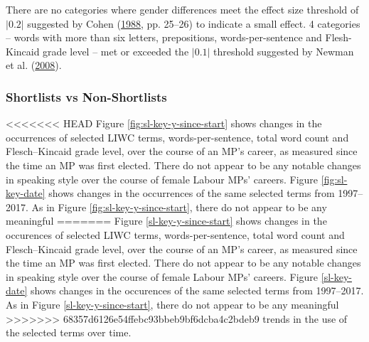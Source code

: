 \documentclass[]{article}
\theoremstyle{definition}
\theoremstyle{definition}
\theoremstyle{definition}
\theoremstyle{remark}
\begin{document}
\begin{table}[H]
\begin{table}[H]
\begin{table}[H]
There are no categories where gender differences meet the effect size
threshold of \(|0.2|\) suggested by Cohen
(\protect\hyperlink{ref-cohen1988}{1988}, pp. 25--26) to indicate a
small effect. 4 categories -- words with more than six letters,
prepositions, words-per-sentence and Flesh-Kincaid grade level -- met or
exceeded the \(|0.1|\) threshold suggested by Newman et al.
(\protect\hyperlink{ref-newman2008}{2008}).

\hypertarget{shortlists-vs-non-shortlists}{%
\subsubsection{Shortlists vs
Non-Shortlists}\label{shortlists-vs-non-shortlists}}

<<<<<<< HEAD
Figure \ref{fig:sl-key-y-since-start} shows changes in the occurrences
of selected LIWC terms, words-per-sentence, total word count and
Flesch--Kincaid grade level, over the course of an MP's career, as
measured since the time an MP was first elected. There do not appear to
be any notable changes in speaking style over the course of female
Labour MPs' careers. Figure \ref{fig:sl-key-date} shows changes in the
occurrences of the same selected terms from 1997--2017. As in Figure
\ref{fig:sl-key-y-since-start}, there do not appear to be any meaningful
=======
Figure \ref{sl-key-y-since-start} shows changes in the occurences of
selected LIWC terms, words-per-sentence, total word count and
Flesch--Kincaid grade level, over the course of an MP's career, as
measured since the time an MP was first elected. There do not appear to
be any notable changes in speaking style over the course of female
Labour MPs' careers. Figure \ref{sl-key-date} shows changes in the
occurences of the same selected terms from 1997--2017. As in Figure
\ref{sl-key-y-since-start}, there do not appear to be any meaningful
>>>>>>> 68357d6126e54ffebc93bbeb9bf6dcba4c2bdeb9
trends in the use of the selected terms over time.


\end{table}
\end{table}
\end{table}
\end{document}
